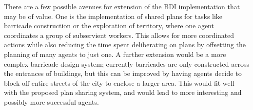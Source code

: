\documentclass[a4paper,12pt]{article}
\begin{document}
There are a few possible avenues for extension of the BDI implementation that may be of value. One is the implementation of shared plans for tasks like barricade construction or the exploration of territory, where one agent coordinates a group of subservient workers. This allows for more coordinated actions while also reducing the time spent deliberating on plans by offsetting the planning of many agents to just one. A further extension would be a more complex barricade design system; currently barricades are only constructed across the entrances of buildings, but this can be improved by having agents decide to block off entire streets of the city to enclose a larger area. This would fit well with the proposed plan sharing system, and would lead to more interesting and possibly more successful agents.


\end{document}
